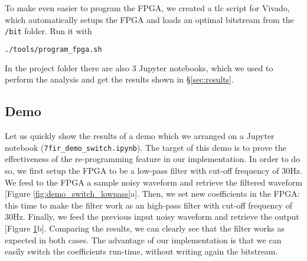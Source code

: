 To make even easier to program the FPGA, we created a tlc script for Vivado, which automatically setups the FPGA and loads an optimal bitstream from the \texttt{/bit} folder. Run it with
\begin{lstlisting}[language=bash]
./tools/program_fpga.sh
\end{lstlisting}

In the project folder there are also 3 Jupyter notebooks, which we used to perform the analysis and get the results shown in §\ref{sec:results}. 






\subsection{Demo}
\label{ssec:switching_demo}

\begin{figure}[H]
    \centering
    \caption{}
    \label{fig:demo_switch_general}
    \label{fig:demo_switch_lowpass}
    
    
    \label{fig:demo_switch_highpass}
    \qquad
\end{figure}

Let us quickly show the results of a demo which we arranged on a Jupyter notebook (\texttt{7fir\_demo\_switch.ipynb}). The target of this demo is to prove the effectiveness of the re-programming feature in our implementation. In order to do so, we first setup the FPGA to be a low-pass filter with cut-off frequency of 30Hz. We feed to the FPGA a sample noisy waveform and retrieve the filtered waveform [Figure \ref{fig:demo_switch_lowpass}a]. Then, we set new coefficients in the FPGA: this time to make the filter work as an high-pass filter with cut-off frequency of 30Hz. Finally, we feed the previous input noisy waveform and retrieve the output [Figure \ref{fig:demo_switch_highpass}b]. Comparing the results, we can clearly see that the filter works as expected in both cases. The advantage of our implementation is that we can easily switch the coefficients run-time, without writing again the bitstream.




